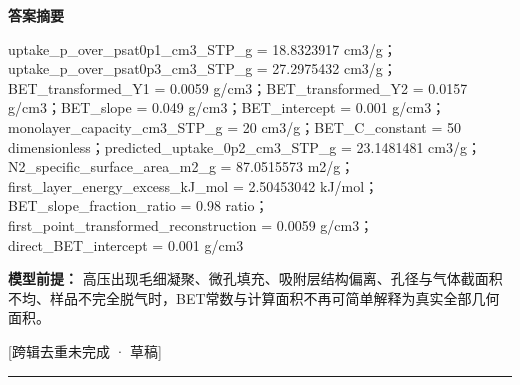 \documentclass[UTF8,11pt,a4paper]{ctexart}
\begin{document}
\noindent\textbf{答案摘要}\par
uptake\_p\_over\_psat0p1\_cm3\_STP\_g = 18.8323917 cm3/g；uptake\_p\_over\_psat0p3\_cm3\_STP\_g = 27.2975432 cm3/g；BET\_transformed\_Y1 = 0.0059 g/cm3；BET\_transformed\_Y2 = 0.0157 g/cm3；BET\_slope = 0.049 g/cm3；BET\_intercept = 0.001 g/cm3；monolayer\_capacity\_cm3\_STP\_g = 20 cm3/g；BET\_C\_constant = 50 dimensionless；predicted\_uptake\_0p2\_cm3\_STP\_g = 23.1481481 cm3/g；N2\_specific\_surface\_area\_m2\_g = 87.0515573 m2/g；first\_layer\_energy\_excess\_kJ\_mol = 2.50453042 kJ/mol；BET\_slope\_fraction\_ratio = 0.98 ratio；first\_point\_transformed\_reconstruction = 0.0059 g/cm3；direct\_BET\_intercept = 0.001 g/cm3\par
\noindent\textbf{模型前提：}
高压出现毛细凝聚、微孔填充、吸附层结构偏离、孔径与气体截面积不均、样品不完全脱气时，BET常数与计算面积不再可简单解释为真实全部几何面积。\par
\noindent\textcolor{red!65!black}{[跨辑去重未完成 · 草稿]} \par
\medskip\hrule\medskip
{}
\end{document}
